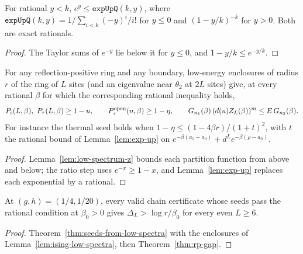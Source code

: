 \begin{lemma}
  \label{lem:exp-up}
  \leanok
  For rational \(y < k\), \(e^y \le \mathtt{expUpQ}(k, y)\), where
  \(\mathtt{expUpQ}(k, y) = 1/\sum_{i<k} (-y)^i/i!\) for \(y \le 0\) and \((1 - y/k)^{-k}\) for
  \(y > 0\). Both are exact rationals.
\end{lemma}
\begin{proof}
  \leanok
  The Taylor sums of \(e^{-y}\) lie below it for \(y \le 0\), and \(1 - y/k \le e^{-y/k}\).
\end{proof}

\begin{theorem}
  \label{thm:seeds-from-low-spectra}
  \leanok
  For any reflection-positive ring and any boundary, low-energy enclosures of radius \(r\) of the
  ring of \(L\) sites (and an eigenvalue near \(\theta_2\) at \(2L\) sites) give, at every
  rational \(\beta\) for which the corresponding rational inequality holds,
  \[
    P_{\mathrm{s}}(L, \beta),\ P_{\tau}(L, \beta) \ge 1 - u, \qquad
    P_{\tau}^{\mathrm{open}}(n, \beta) \ge 1 - \eta, \qquad
    G_{n_1}(\beta)\,(d(u) Z_L(\beta))^m \le E\, G_{n_2}(\beta).
  \]
  For instance the thermal seed holds when
  \(1 - \eta \le (1 - 4\beta r)/(1 + t)^2\), with \(t\) the rational bound of
  Lemma~\ref{lem:exp-up} on \(e^{-\beta(a_1 - a_0)} + d^L e^{-\beta(\rho - a_0)}\).
\end{theorem}
\begin{proof}
  \leanok
  Lemma~\ref{lem:low-spectrum-z} bounds each partition function from above and below; the ratio
  step uses \(e^{-x} \ge 1 - x\), and Lemma~\ref{lem:exp-up} replaces each exponential by a
  rational.
\end{proof}

\begin{theorem}
  \label{thm:ising-ring-any-beta}
  \leanok
  At \((g, h) = (1/4, 1/20)\), every valid chain certificate whose seeds pass the rational
  condition at \(\beta_0 > 0\) gives \(\Delta_L > \log r / \beta_0\) for every even \(L \ge 6\).
\end{theorem}
\begin{proof}
  \leanok
  Theorem~\ref{thm:seeds-from-low-spectra} with the enclosures of
  Lemma~\ref{lem:ising-low-spectra}, then Theorem~\ref{thm:rp-gap}.
\end{proof}

